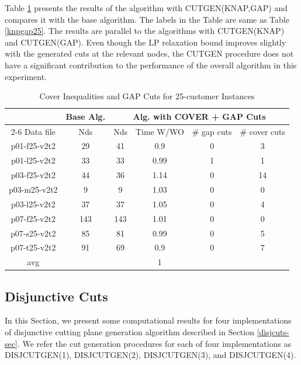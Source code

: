 Table \ref{knpgap25-2} presents the results of the algorithm with CUTGEN(KNAP,GAP)
and compares it with the base algorithm. The labels in the Table are same as
Table \ref{knpgap25}. The results are parallel to the algorithms  with CUTGEN(KNAP)
and CUTGEN(GAP). Even though the LP relaxation bound improves slightly
with the generated cuts at the relevant nodes, the CUTGEN procedure does not have a
significant contribution to the performance of the overall algorithm in this experiment.
\begin{table}[h!tbp]
\centering
\caption{Cover Inequalities and GAP Cuts for 25-customer Instances}\label{knpgap25-2}
\begin {tabular}[t]{|c|c|c|c|c|c|}
\hline
\mbox{} & Base Alg. & \multicolumn{4}{|c|}{Alg. with COVER + GAP Cuts} \\\cline{2-6}
Data file & Nds & Nds & Time W/WO & \# gap cuts & \# cover cuts \\\hline
p01-f25-v2t2 &  29  & 41    & 0.9   & 0 & 3 \\
p01-l25-v2t2 &  33  & 33    & 0.99  & 1 & 1 \\
p03-f25-v2t2 &  44  & 36    & 1.14  & 0 & 14    \\
p03-m25-v2t2 &  9   & 9 & 1.03  & 0 & 0 \\
p03-l25-v2t2 &  37  & 37    & 1.05  & 0 & 4 \\
p07-f25-v2t2 &  143 & 143   & 1.01  & 0 & 0 \\
p07-s25-v2t2 &  85  & 81    & 0.99  & 0 & 5 \\
p07-t25-v2t2 &  91  & 69    & 0.9   & 0 & 7 \\\hline
avg & \mbox{}   & \mbox{}   & 1 & \mbox{}   & \mbox{} \\\hline
\end{tabular}
\end{table}

\subsection{Disjunctive Cuts}
\label{sec:disjcutres}

In this Section, we present some computational results for four
implementations of disjunctive cutting plane generation algorithm
described in Section \ref{disjcuts-sec}. We refer the cut generation
procedures for each of four implementations as DISJCUTGEN(1),
DISJCUTGEN(2), DISJCUTGEN(3), and DISJCUTGEN(4).

